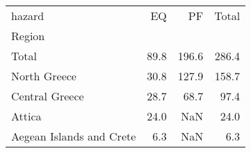\begin{tabular}{lrrr}
\toprule
hazard &    EQ &     PF &  Total \\
Region                   &       &        &        \\
\midrule
Total                    &  89.8 &  196.6 &  286.4 \\
North Greece             &  30.8 &  127.9 &  158.7 \\
Central Greece           &  28.7 &   68.7 &   97.4 \\
Attica                   &  24.0 &    NaN &   24.0 \\
Aegean Islands and Crete &   6.3 &    NaN &    6.3 \\
\bottomrule
\end{tabular}
